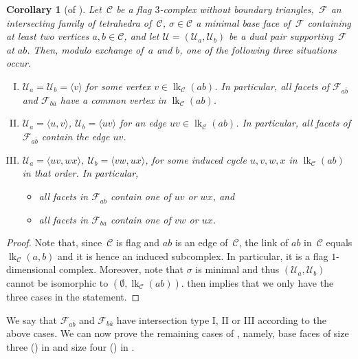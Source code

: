 \documentclass[a4paper,12pt]{amsart}
\theoremstyle{plain}
\newtheorem{corollary}[theorem]{Corollary}
\theoremstyle{definition}
\newcommand{\U}{\mathcal U}
\newcommand{\C}{\mathcal C}
\newcommand{\family}{\mathcal F}
\newcommand{\face}{\sigma}
\DeclareMathOperator{\link}{lk}
\newcommand{\lkcap}[3]{\operatorname{lk}_{#1} (#2,#3)}
\begin{document}
\begin{corollary}[of ]
\label{lemma:intersection_cases}
Let~$\C$ be a flag $3$-complex without boundary triangles,~$\family$ an intersecting family of tetrahedra of~$\C$, $\face \in \C$ a minimal base face of~$\family$ containing at least two vertices $a,b\in\C$, and let $\U = (\U_a,\U_b)$ be a dual pair supporting~$\family$ at $ab$. Then, modulo exchange of~$a$ and $b$, one of the following three situations occur.
\begin{enumerate}[I)]
\item $\U_a = \U_b = \langle v \rangle$ for some vertex $v \in \link_\C (ab)$.
In particular, all facets of $\family_{a\overline b}$ and $\family_{b \overline a}$ have a common vertex in $\link_\C ({ab})$.

\item $\U_a = \langle u,v \rangle$, $\U_b = \langle uv \rangle$ for an edge $uv \in \link_\C (ab)$. In particular, all facets of $\family_{a \overline b}$ contain the edge $uv$.

\item  $\U_a = \langle uv, wx \rangle$, $\U_b = \langle vw, ux \rangle$, for some induced cycle $u, v, w, x$ in $\link_\C (ab)$ in that order. In particular,
\begin{itemize}
\item all facets in $\family_{a \overline b}$ contain one of $uv$ or  $wx$, and
\item all facets in $\family_{b \overline a}$ contain one of $vw$ or  $ux$.
\end{itemize}
\end{enumerate}
\end{corollary}


\begin{proof}
  Note that, since~$\C$ is flag and $ab$ is an edge of~$\C$, the link of $ab$ in~$\C$ equals 
  $\lkcap{\C}{a}{b}$ and it is hence an induced subcomplex. In particular, it is 
  a flag $1$-dimensional complex. Moreover, note that $\face$ is minimal and thus $(\U_a,\U_b)$ cannot be isomorphic to $(\emptyset, \link_\C (ab))$.  then implies that we only have the three cases in the statement.
\end{proof}

We say that $\family_{a\overline b}$ and $\family_{b \overline a}$ have intersection type I, II or III according to the above cases.
We can now prove the remaining cases of , namely, base faces of size three () in  and size four () in .
\end{document}
